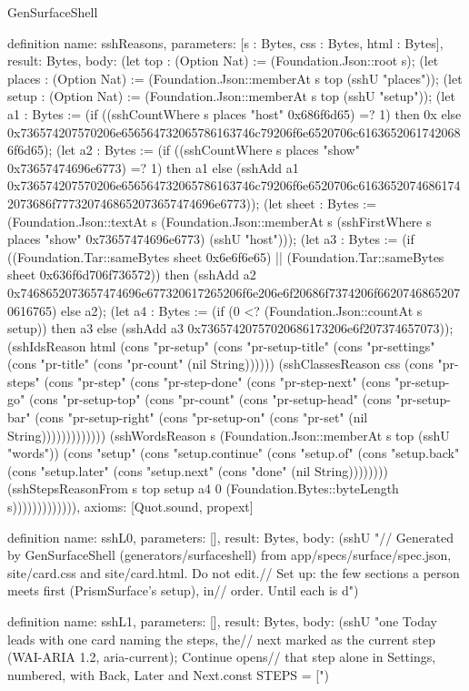 \begin{lexlean}{GenSurfaceShell}
\begin{semanticmodule}
definition{
  name: sshReasons,
  parameters: [s : Bytes, css : Bytes, html : Bytes],
  result: Bytes,
  body: (let top : (Option Nat) := (Foundation.Json::root s); (let places : (Option Nat) := (Foundation.Json::memberAt s top (sshU "places")); (let setup : (Option Nat) := (Foundation.Json::memberAt s top (sshU "setup")); (let a1 : Bytes := (if ((sshCountWhere s places "host" 0x686f6d65) =? 1) then 0x else 0x736574207570206e656564732065786163746c79206f6e6520706c61636520617420686f6d65); (let a2 : Bytes := (if ((sshCountWhere s places "show" 0x73657474696e6773) =? 1) then a1 else (sshAdd a1 0x736574207570206e656564732065786163746c79206f6e6520706c61636520746861742073686f7773207468652073657474696e6773)); (let sheet : Bytes := (Foundation.Json::textAt s (Foundation.Json::memberAt s (sshFirstWhere s places "show" 0x73657474696e6773) (sshU "host"))); (let a3 : Bytes := (if ((Foundation.Tar::sameBytes sheet 0x6e6f6e65) || (Foundation.Tar::sameBytes sheet 0x636f6d706f736572)) then (sshAdd a2 0x7468652073657474696e677320617265206f6e206e6f20686f7374206f66207468652070616765) else a2); (let a4 : Bytes := (if (0 <? (Foundation.Json::countAt s setup)) then a3 else (sshAdd a3 0x73657420757020686173206e6f207374657073)); (sshIdsReason html (cons "pr-setup" (cons "pr-setup-title" (cons "pr-settings" (cons "pr-title" (cons "pr-count" (nil String)))))) (sshClassesReason css (cons "pr-steps" (cons "pr-step" (cons "pr-step-done" (cons "pr-step-next" (cons "pr-setup-go" (cons "pr-setup-top" (cons "pr-count" (cons "pr-setup-head" (cons "pr-setup-bar" (cons "pr-setup-right" (cons "pr-setup-on" (cons "pr-set" (nil String))))))))))))) (sshWordsReason s (Foundation.Json::memberAt s top (sshU "words")) (cons "setup" (cons "setup.continue" (cons "setup.of" (cons "setup.back" (cons "setup.later" (cons "setup.next" (cons "done" (nil String)))))))) (sshStepsReasonFrom s top setup a4 0 (Foundation.Bytes::byteLength s))))))))))))),
  axioms: [Quot.sound, propext]
}

definition{
  name: sshL0,
  parameters: [],
  result: Bytes,
  body: (sshU "// Generated by GenSurfaceShell (generators/surfaceshell) from app/specs/surface/spec.json, site/card.css and site/card.html. Do not edit.\n// Set up: the few sections a person meets first (PrismSurface's setup), in\n// order. Until each is d")
}

definition{
  name: sshL1,
  parameters: [],
  result: Bytes,
  body: (sshU "one Today leads with one card naming the steps, the\n// next marked as the current step (WAI-ARIA 1.2, aria-current); Continue opens\n// that step alone in Settings, numbered, with Back, Later and Next.\n\nexport const STEPS = [")
}


\end{semanticmodule}
\end{lexlean}
